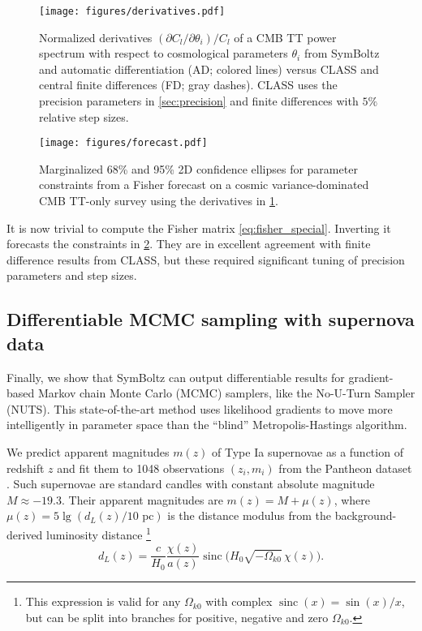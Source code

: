 \documentclass{aa}
\DeclareMathOperator{\sinc}{sinc}
\begin{document}
\begin{figure}
    \centering
    \texttt{[image: figures/derivatives.pdf]}
    \caption{Normalized derivatives $(\partial C_l / \partial \theta_i) / C_l$ of a CMB TT power spectrum with respect to cosmological parameters $\theta_i$ from SymBoltz and automatic differentiation (AD; colored lines) versus CLASS and central finite differences (FD; gray dashes). CLASS uses the precision parameters in \cref{sec:precision} and finite differences with $5 \%$ relative step sizes.}
    \label{fig:derivatives}
\end{figure}

\begin{figure}
    \centering
    \texttt{[image: figures/forecast.pdf]}
    \caption{Marginalized 68\% and 95\% 2D confidence ellipses for parameter constraints from a Fisher forecast on a cosmic variance-dominated CMB TT-only survey using the derivatives in \cref{fig:derivatives}.}
    \label{fig:forecast}
\end{figure}

It is now trivial to compute the Fisher matrix \eqref{eq:fisher_special}.
Inverting
it forecasts the constraints in \cref{fig:forecast}.
They are in excellent agreement with finite difference results from CLASS, but these required significant tuning of precision parameters and step sizes.

\subsection{Differentiable MCMC sampling with supernova data}

Finally, we show that SymBoltz can output differentiable results for gradient-based Markov chain Monte Carlo (MCMC) samplers, like the No-U-Turn Sampler (NUTS).
This state-of-the-art method uses likelihood gradients to move more intelligently in parameter space than the \enquote{blind} Metropolis-Hastings algorithm.

We predict apparent magnitudes $m(z)$ of Type Ia supernovae as a function of redshift $z$ and fit them to 1048 observations $(z_i, m_i)$ from the Pantheon dataset \citep{scolnicCompleteLightcurveSample2018}.
Such supernovae are standard candles with constant
absolute magnitude $M \approx -19.3$.
Their apparent magnitudes are $m(z) = M + \mu(z)$, where $\mu(z) = 5 \lg (d_L(z) / 10\text{ pc})$ is the distance modulus from the background-derived luminosity distance%
\footnote{This expression is valid for any $\Omega_{k0}$ with complex $\sinc(x) = \sin(x)/x$, but can be split into branches for positive, negative and zero $\Omega_{k0}$.}
\begin{equation}
    d_L(z) = \frac{c}{H_0} \frac{\chi(z)}{a(z)} \sinc \Big( H_0 \sqrt{-\Omega_{k0}} \, \chi(z) \Big) .
\end{equation}
\end{document}
